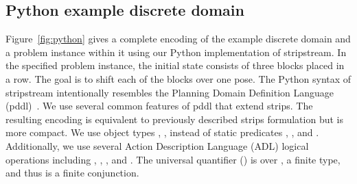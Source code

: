 \documentclass[letterpaper]{article} %
\theoremstyle{plain}\newtheorem{thm}{Theorem}
\theoremstyle{definition}\newtheorem{defn}{Definition}
\theoremstyle{plain}\newtheorem{lem}{Lemma}
\theoremstyle{plain}\newtheorem{cor}{Corollary}
\newcommand{\algname}{{\sc strips}tream}
\newcommand{\strips}{{\sc strips}}
\newcommand{\pddl}{{\sc pddl}}
\begin{document}
%

\subsection{Python example discrete domain}

Figure~\ref{fig:python} gives a complete encoding of the example discrete domain and a problem instance within it using our Python implementation of \algname{}. In the specified problem instance, the initial state consists of three blocks placed in a row. The goal is to shift each of the blocks over one pose. The Python syntax of \algname{} intentionally resembles the Planning Domain Definition Language (\pddl{})~\cite{mcdermott1998pddl}. We use several common features of \pddl{} that extend \strips{}. The resulting encoding is equivalent to previously described \strips{} formulation but is more compact. 
We use object types , ,  instead of static predicates , , and .
Additionally, we use several Action Description Language ({\sc ADL}) logical operations including , , , and . The universal quantifier () is over , a finite type, and thus is a finite conjunction. 
\end{document}
